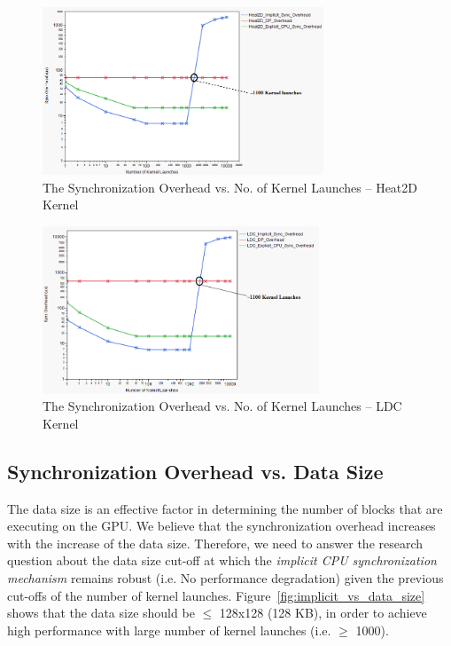 \documentclass[conference]{IEEEtran}
\begin{document}
\begin{figure}
	\includegraphics[width=1.0\columnwidth, height=5cm]{heat2d_sync_log.png}
	\caption{The Synchronization Overhead vs. No. of Kernel Launches -- Heat2D Kernel}
	\label{fig:heat}
\end{figure}
\begin{figure}
	\includegraphics[width=1.0\columnwidth, height=5cm]{ldc_sync_log.png}
	\caption{The Synchronization Overhead vs. No. of Kernel Launches -- LDC Kernel}
	\label{fig:ldc}
\end{figure}

\subsection{Synchronization Overhead vs. Data Size}
The data size is an effective factor in determining the number of blocks that are executing on the GPU. We believe that the synchronization overhead increases with the increase of the data size. Therefore, we need to answer the research question about the data size cut-off at which the \emph{implicit CPU synchronization mechanism} remains robust (i.e. No performance degradation) given the previous cut-offs of the number of kernel launches. Figure~\ref{fig:implicit_vs_data_size} shows that the data size should be $\leq$ 128x128 (128 KB), in order to achieve high performance with large number of kernel launches (i.e. $\geq$ 1000).
 
\end{document}
